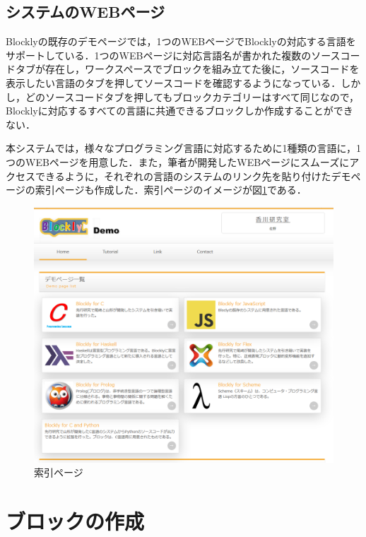 \documentclass{risepaper}
\begin{document}
   \subsection{システムのWEBページ}
   
Blocklyの既存のデモページでは，1つのWEBページでBlocklyの対応する言語をサポートしている．1つのWEBページに対応言語名が書かれた複数のソースコードタブが存在し，ワークスペースでブロックを組み立てた後に，ソースコードを表示したい言語のタブを押してソースコードを確認するようになっている．しかし，どのソースコードタブを押してもブロックカテゴリーはすべて同じなので，Blocklyに対応するすべての言語に共通できるブロックしか作成することができない．

本システムでは，様々なプログラミング言語に対応するために1種類の言語に，1つのWEBページを用意した．また，筆者が開発したWEBページにスムーズにアクセスできるように，それぞれの言語のシステムのリンク先を貼り付けたデモページの索引ページも作成した．索引ページのイメージが図\ref{fig:index}である．

\begin{figure}[h]
\begin{center}
\includegraphics[scale=0.5]{img/index.PNG}
\caption{索引ページ}%
\label{fig:index}
\end{center}%
\end{figure}%
   
   \section{ブロックの作成}
\end{document}
